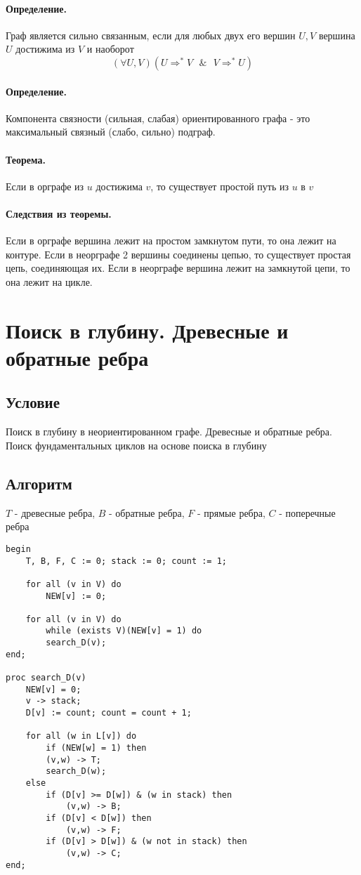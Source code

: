 \documentclass{report}
\newcommand{\band}{\mbox{ } \& \mbox{ }}
\newcommand{\pathto}[1][1]{ \Rightarrow^{*}_{#1} }
\begin{document}
\paragraph*{Определение.}
Граф является сильно связанным, если для любых двух его вершин $U, V$ вершина  $U$ достижима
из  $V$ и наоборот
\[
(\forall U,V)(U \pathto[] V \band V \pathto[] U)
\] 

\paragraph*{Определение.}
Компонента связности (сильная, слабая) ориентированного графа - это максимальный связный
(слабо, сильно) подграф.

\paragraph*{Теорема.}
Если в орграфе из $u$ достижима  $v$, то существует простой путь из  $u$ в  $v$

\paragraph*{Следствия из теоремы.}
Если в орграфе вершина лежит на простом замкнутом пути, то она лежит на контуре.
Если в неорграфе 2 вершины соединены цепью, то существует простая цепь, соединяющая их.
Если в неорграфе вершина лежит на замкнутой цепи, то она лежит на цикле.

\newpage

\section{Поиск в глубину. Древесные и обратные ребра}
\subsection{Условие}
Поиск в глубину в неориентированном графе. Древесные и обратные ребра. Поиск
фундаментальных циклов на основе поиска в глубину

\subsection{Алгоритм}

$T$ - древесные ребра,  $B$ - обратные ребра,  $F$ - прямые ребра,
 $C$ - поперечные ребра

\begin{lstlisting}
begin
    T, B, F, C := 0; stack := 0; count := 1;

    for all (v in V) do
    	NEW[v] := 0;

    for all (v in V) do
    	while (exists V)(NEW[v] = 1) do
	    search_D(v);
end;

proc search_D(v)
    NEW[v] = 0;
    v -> stack;
    D[v] := count; count = count + 1;

    for all (w in L[v]) do
    	if (NEW[w] = 1) then
	    (v,w) -> T;
	    search_D(w);
	else
	    if (D[v] >= D[w]) & (w in stack) then
	    	(v,w) -> B;
	    if (D[v] < D[w]) then
	    	(v,w) -> F;
	    if (D[v] > D[w]) & (w not in stack) then
	        (v,w) -> C;
end;
\end{lstlisting}
\end{document}
